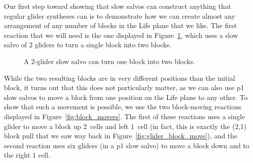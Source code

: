 Our first step toward showing that slow salvos can construct anything that regular glider syntheses can is to demonstrate how we can create almost any arrangement of any number of blocks in the Life plane that we like. The first reaction that we will need is the one displayed in Figure~\ref{fig:slow_salvo_splitter}, which uses a slow salvo of $2$ gliders to turn a single block into two blocks.

\begin{figure}[!htb]
	\centering{}
	\caption{A $2$-glider slow salvo can turn one block into two blocks.}\label{fig:slow_salvo_splitter}
\end{figure}

While the two resulting blocks are in very different positions than the initial block, it turns out that this does not particularly matter, as we can also use p1 slow salvos to move a block from one position on the Life plane to any other. To show that such a movement is possible, we use the two block-moving reactions displayed in Figure~\ref{fig:block_movers}. The first of these reactions uses a single glider to move a block up $2$~cells and left $1$~cell (in fact, this is exactly the (2,1) block pull that we saw way back in Figure~\ref{fig:glider_block_move}), and the second reaction uses six gliders (in a p1 slow salvo) to move a block down and to the right $1$ cell.


